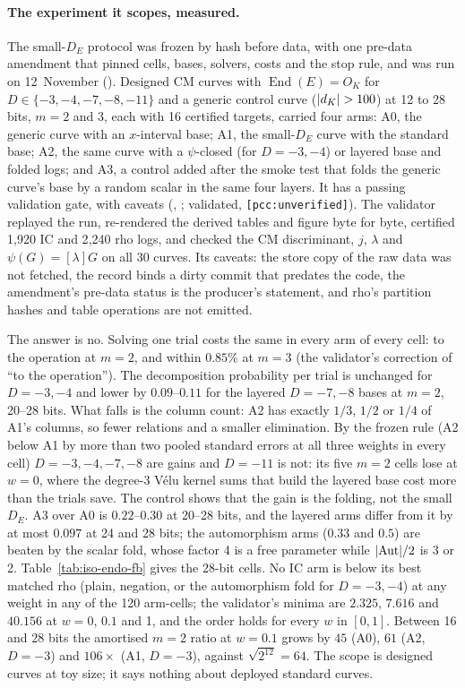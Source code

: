\paragraph{The experiment it scopes, measured.} The small-$D_E$ protocol was
frozen by hash before data, with one pre-data amendment that pinned cells,
bases, solvers, costs and the stop rule, and was run on 12~November
(). Designed CM curves
with $\operatorname{End}(E)=O_K$ for $D\in\{-3,-4,-7,-8,-11\}$ and a generic
control curve ($\lvert d_K \rvert>100$) at 12 to 28 bits, $m=2$ and 3, each with
16 certified targets, carried four arms: A0, the generic curve with an
$x$-interval base; A1, the small-$D_E$ curve with the standard base; A2, the
same curve with a $\psi$-closed (for $D=-3,-4$) or layered base and folded
logs; and A3, a control added after the smoke test that folds the generic
curve's base by a random scalar in the same four layers. It has a passing
validation gate, with caveats
(,
; validated,
\texttt{[pcc:unverified]}). The validator replayed the run, re-rendered the
derived tables and figure byte for byte, certified 1{,}920 IC and 2{,}240 rho
logs, and checked the CM discriminant, $j$, $\lambda$ and $\psi(G)=[\lambda]G$
on all 30 curves. Its caveats: the store copy of the raw data was not
fetched, the record binds a dirty commit that predates the code, the
amendment's pre-data status is the producer's statement, and rho's
partition hashes and table operations are not emitted.

The answer is no. Solving one trial costs the same in every arm of every
cell: to the operation at $m=2$, and within $0.85\%$ at $m=3$ (the
validator's correction of ``to the operation''). The decomposition
probability per trial is unchanged for $D=-3,-4$ and lower by $0.09$--$0.11$
for the layered $D=-7,-8$ bases at $m=2$, 20--28 bits. What falls is the
column count: A2 has exactly $1/3$, $1/2$ or $1/4$ of A1's columns, so fewer
relations and a smaller elimination. By the frozen rule (A2 below A1 by
more than two pooled standard errors at all three weights in every cell)
$D=-3,-4,-7,-8$ are gains and $D=-11$ is not: its five $m=2$ cells lose at
$w=0$, where the degree-3 V\'elu kernel sums that build the layered base
cost more than the trials save. The control shows that the gain is the
folding, not the small $D_E$. A3 over A0 is $0.22$--$0.30$ at 20--28 bits, and
the layered arms differ from it by at most $0.097$ at 24 and 28 bits; the
automorphism arms ($0.33$ and $0.5$) are beaten by the scalar fold, whose
factor 4 is a free parameter while $\lvert \operatorname{Aut} \rvert/2$ is 3 or 2.
Table~\ref{tab:iso-endo-fb} gives the 28-bit cells. No IC arm is below its
best matched rho (plain, negation, or the automorphism fold for $D=-3,-4$) at
any weight in any of the 120 arm-cells; the validator's minima are $2.325$,
$7.616$ and $40.156$ at $w=0$, $0.1$ and 1, and the order holds for every $w$
in $[0,1]$. Between 16 and 28 bits the amortised $m=2$ ratio at $w=0.1$ grows
by $45$ (A0), $61$ (A2, $D=-3$) and $106\times$ (A1, $D=-3$), against
$\sqrt{2^{12}}=64$. The scope is designed curves at toy size; it says
nothing about deployed standard curves.

